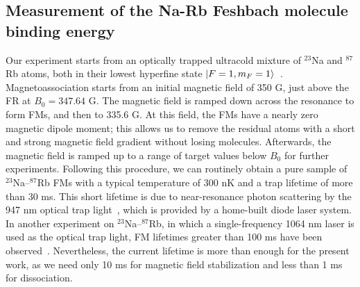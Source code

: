 \subsection{Measurement of the Na-Rb Feshbach molecule binding energy}

Our experiment starts from an optically trapped ultracold mixture of $^{23}$Na and $^{87}$Rb atoms, both in their lowest hyperfine state $\ket{F = 1, m_F = 1}$~\cite{wang2013observation,wang2015formation,jia2020}. Magnetoassociation starts from an initial magnetic field of 350 G, just above the FR at $B_0 = 347.64$ G. The magnetic field is ramped down across the resonance to form FMs, and then to 335.6 G. At this field, the FMs have a nearly zero magnetic dipole moment; this allows us to remove the residual atoms with a short and strong magnetic field gradient without losing molecules. Afterwards, the magnetic field is ramped up to a range of target values below $B_0$ for further experiments. Following this procedure, we can routinely obtain a pure sample of $^{23}$Na--$^{87}$Rb FMs with a typical temperature of 300 nK and a trap lifetime of more than 30 ms. This short lifetime is due to near-resonance photon scattering by the 947 nm optical trap light~\cite{Guo2017,jia2020}, which is provided by a home-built diode laser system. In another experiment on $^{23}$Na--$^{87}$Rb, in which a single-frequency 1064 nm laser is used as the optical trap light, FM lifetimes greater than 100 ms have been observed~\cite{Wang2019,guo2021leehuangyang}. Nevertheless, the current lifetime is more than enough for the present work, as we need only 10 ms for magnetic field stabilization and less than 1 ms for dissociation.


